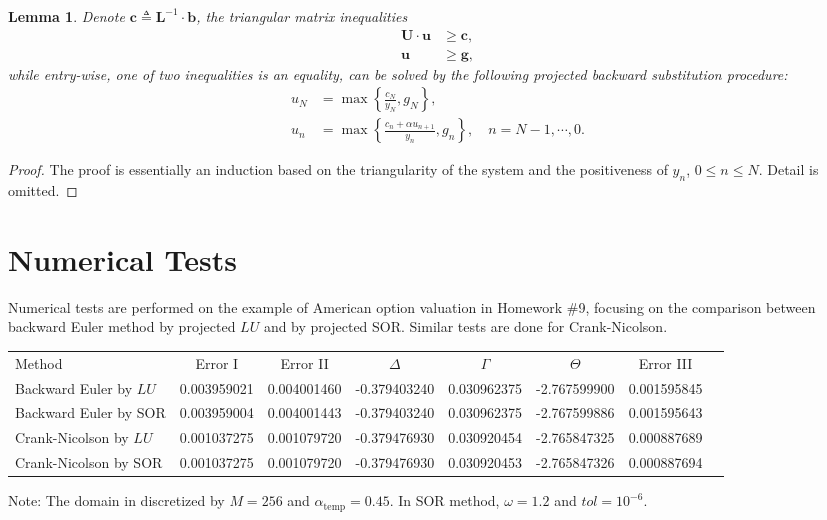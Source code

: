 \documentclass[paper=a4, fontsize=10pt,]{scrartcl} %
\newtheorem{lemma}[theorem]{Lemma}
\theoremstyle{theorem}
\theoremstyle{remark}
\theoremstyle{example}
\numberwithin{equation}{section} %
\numberwithin{figure}{section} %
\numberwithin{table}{section} %
\begin{document}
\begin{lemma}
Denote $\mathbf{c} \triangleq \mathbf{L}^{-1}\cdot\mathbf{b}$, the triangular matrix inequalities
\begin{align}\label{ineq3}
\mathbf{U}\cdot\mathbf{u} &\ge \mathbf{c}, \\
\label{ineq4} \mathbf{u} &\ge \mathbf{g},
\end{align}
while entry-wise, one of two inequalities is an equality, can be solved by the following projected backward substitution procedure:
\begin{align*}
u_{N} &= \max\left\{ \frac{c_N}{y_N}, g_N \right\},\\
u_{n} &=  \max\left\{ \frac{c_n + \alpha u_{n+1}}{y_n}, g_n\right\}, \quad n=N-1,\cdots, 0.
\end{align*}
\end{lemma}
\begin{proof}
The proof is essentially an induction based on the triangularity of the system and the positiveness of $y_n$, $0\le n\le N$. Detail is omitted.
\end{proof}

\section{Numerical Tests}
Numerical tests are performed on the example of American option valuation in Homework \#9, focusing on the comparison between backward Euler method by projected $LU$ and by projected SOR. Similar tests are done for Crank-Nicolson. 
\begin{footnotesize}
\begin{center}
\begin{tabular}{l*{6}{c}r}
Method              &  Error I &  Error II & $\Delta$ & $\Gamma$ & $\Theta$  & Error III \\
\hhline{=======}
Backward Euler by $LU$  & 0.003959021	& 0.004001460	& -0.379403240	& 0.030962375	& -2.767599900	& 0.001595845 \\
Backward Euler by SOR   & 0.003959004	& 0.004001443	& -0.379403240	& 0.030962375	& -2.767599886	& 0.001595643 \\
\hline
Crank-Nicolson by $LU$  & 0.001037275	& 0.001079720	& -0.379476930	& 0.030920454	& -2.765847325	& 0.000887689 \\
Crank-Nicolson by SOR   & 0.001037275	& 0.001079720	& -0.379476930	& 0.030920453	& -2.765847326	& 0.000887694 \\
\hline
\end{tabular}
\end{center}
Note: The domain in discretized by $M=256$ and $\alpha_{\text{temp}}=0.45$. In SOR method, $\omega=1.2$ and $tol=10^{-6}$.
\end{footnotesize}
\end{document}
